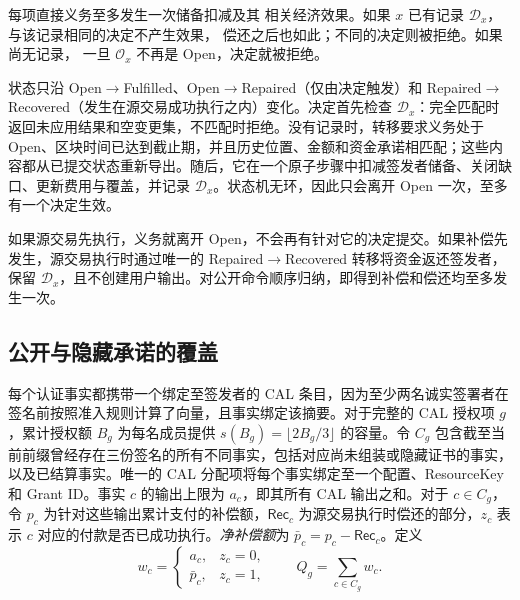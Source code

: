 \begin{lemma}[补偿至多生效一次]
\label{lem:security-decision}
每项直接义务至多发生一次储备扣减及其
相关经济效果。如果 $x$ 已有记录
$\mathcal D_x$，与该记录相同的决定不产生效果，
偿还之后也如此；不同的决定则被拒绝。如果尚无记录，
一旦 $\mathcal O_x$ 不再是 Open，决定就被拒绝。
\end{lemma}
\begin{IEEEproof}
状态只沿 Open$\to$Fulfilled、Open$\to$Repaired（仅由决定触发）和 Repaired$\to$Recovered（发生在源交易成功执行之内）变化。决定首先检查 $\mathcal D_x$：完全匹配时返回未应用结果和空变更集，不匹配时拒绝。没有记录时，转移要求义务处于 Open、区块时间已达到截止期，并且历史位置、金额和资金承诺相匹配；这些内容都从已提交状态重新导出。随后，它在一个原子步骤中扣减签发者储备、关闭缺口、更新费用与覆盖，并记录 $\mathcal D_x$。状态机无环，因此只会离开 Open 一次，至多有一个决定生效。

如果源交易先执行，义务就离开 Open，不会再有针对它的决定提交。如果补偿先发生，源交易执行时通过唯一的 Repaired$\to$Recovered 转移将资金返还签发者，保留 $\mathcal D_x$，且不创建用户输出。对公开命令顺序归纳，即得到补偿和偿还均至多发生一次。
\end{IEEEproof}

\subsection{公开与隐藏承诺的覆盖}
\label{sec:security-coverage}

每个认证事实都携带一个绑定至签发者的 CAL 条目，因为至少两名诚实签署者在签名前按照准入规则计算了向量，且事实绑定该摘要。对于完整的 CAL 授权项 $g$，累计授权额 $B_g$ 为每名成员提供 $s(B_g)=\lfloor2B_g/3\rfloor$ 的容量。令 $C_g$ 包含截至当前前缀曾经存在三份签名的所有不同事实，包括对应尚未组装或隐藏证书的事实，以及已结算事实。唯一的 CAL 分配项将每个事实绑定至一个配置、ResourceKey 和 Grant ID。事实 $c$ 的输出上限为 $a_c$，即其所有 CAL 输出之和。对于 $c\in C_g$，令 $p_c$ 为针对这些输出累计支付的补偿额，$\mathsf{Rec}_c$ 为源交易执行时偿还的部分，$z_c$ 表示 $c$ 对应的付款是否已成功执行。\emph{净补偿额}为 $\bar p_c=p_c-\mathsf{Rec}_c$。定义
\begin{equation}
  w_c=\begin{cases}a_c,&z_c=0,\\\bar p_c,&z_c=1,\end{cases}
  \qquad Q_g=\sum_{c\in C_g}w_c.
  \label{eq:security-risk}
\end{equation}

